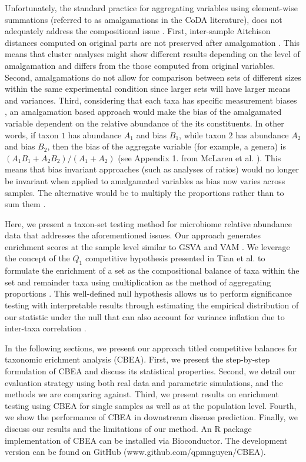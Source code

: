Unfortunately, the standard practice for aggregating variables using element-wise summations (referred to as amalgamations in the CoDA literature), does not adequately address the compositional issue \cite{mclaren2019}. First, inter-sample Aitchison distances computed on original parts are not preserved after amalgamation \cite{egozcue2005}. This means that cluster analyses might show different results depending on the level of amalgamation and differs from the those computed from original variables. Second, amalgamations do not allow for comparison between sets of different sizes within the same experimental condition since larger sets will have larger means and variances. Third, considering that each taxa has specific measurement biases \cite{mclaren2019}, an amalgamation based approach would make the bias of the amalgamated variable dependent on the relative abundance of the its constituents. In other words, if taxon $1$ has abundance $A_1$ and bias $B_1$, while taxon $2$ has abundance $A_2$ and bias $B_2$, then the bias of the aggregate variable (for example, a genera) is $(A_1B_1 + A_2B_2)/(A_1 + A_2)$ (see Appendix 1. from McLaren et al. \cite{mclaren2019}). This means that bias invariant approaches (such as analyses of ratios) would no longer be invariant when applied to amalgamated variables as bias now varies across samples. The alternative would be to multiply the proportions rather than to sum them \cite{egozcue2005}. 

Here, we present a taxon-set testing method for microbiome relative abundance data that addresses the aforementioned issues. Our approach generates enrichment scores at the sample level similar to GSVA \cite{hanzelmann2013} and VAM \cite{frost2020}. We leverage the concept of the $Q_1$ competitive hypothesis presented in Tian et al. \cite{tian2005} to formulate the enrichment of a set as the compositional balance \cite{rivera-pinto2018} of taxa within the set and remainder taxa using multiplication as the method of aggregating proportions \cite{egozcue2005}. This well-defined null hypothesis allows us to perform significance testing with interpretable results through estimating the empirical distribution of our statistic under the null that can also account for variance inflation due to inter-taxa correlation \cite{wu2012}. 

In the following sections, we present our approach titled competitive balances for taxonomic erichment analysis (CBEA). First, we present the step-by-step formulation of CBEA and discuss its statistical properties. Second, we detail our evaluation strategy using both real data and parametric simulations, and the methods we are comparing against. Third, we present results on enrichment testing using CBEA for single samples as well as at the population level. Fourth, we show the performance of CBEA in downstream disease prediction. Finally, we discuss our results and the limitations of our method. An R package implementation of CBEA can be installed via Bioconductor. The development version can be found on GitHub (www.github.com/qpmnguyen/CBEA).

